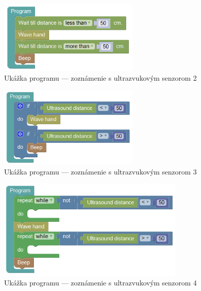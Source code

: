 \begin{figure}
\centerline{\includegraphics[width=0.6\textwidth]{images/example-wave-on-proximity-2}}
\caption[Ukážka programu --- zoznámenie s ultrazvukovým senzorom 2]{Ukážka programu --- zoznámenie s ultrazvukovým senzorom 2}
\label{obr:example-wave-on-proximity-2}
\end{figure}

\begin{figure}
\centerline{\includegraphics[width=0.6\textwidth]{images/example-wave-on-proximity-3}}
\caption[Ukážka programu --- zoznámenie s ultrazvukovým senzorom 3]{Ukážka programu --- zoznámenie s ultrazvukovým senzorom 3}
\label{obr:example-wave-on-proximity-3}
\end{figure}

\begin{figure}
\centerline{\includegraphics[width=0.8\textwidth]{images/example-wave-on-proximity-4}}
\caption[Ukážka programu --- zoznámenie s ultrazvukovým senzorom 4]{Ukážka programu --- zoznámenie s ultrazvukovým senzorom 4}
\label{obr:example-wave-on-proximity-4}
\end{figure}

